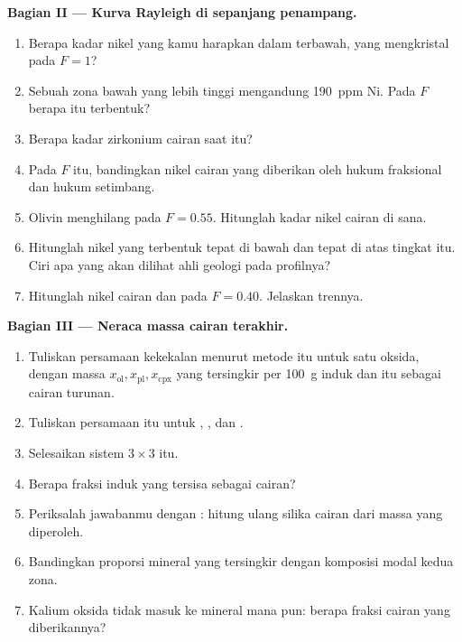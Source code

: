 \begin{problem}
\noindent\textbf{Bagian II --- Kurva Rayleigh di sepanjang penampang.}
\begin{enumerate}[resume]
\item Berapa kadar nikel yang kamu harapkan dalam  terbawah, yang mengkristal pada
$F = 1$?
\item Sebuah  zona bawah yang lebih tinggi mengandung \qty{190}{ppm} Ni. Pada $F$ berapa  itu
terbentuk?
\item Berapa kadar zirkonium cairan saat itu?
\item Pada $F$ itu, bandingkan nikel cairan yang diberikan oleh hukum fraksional dan hukum
setimbang.
\item Olivin menghilang pada $F = 0.55$. Hitunglah kadar nikel cairan
di sana.
\item Hitunglah nikel  yang terbentuk tepat di bawah dan tepat di atas tingkat
itu. Ciri apa yang akan dilihat ahli geologi pada profilnya?
\item Hitunglah nikel cairan dan  pada $F = 0.40$. Jelaskan
trennya.
\end{enumerate}

\noindent\textbf{Bagian III --- Neraca massa cairan terakhir.}
\begin{enumerate}[resume]
\item Tuliskan persamaan kekekalan menurut metode itu untuk satu oksida, dengan massa
$x_{\mathrm{ol}}, x_{\mathrm{pl}}, x_{\mathrm{cpx}}$ yang tersingkir per \qty{100}{g}
 induk dan  itu sebagai cairan turunan.
\item Tuliskan persamaan itu untuk , , dan .
\item Selesaikan sistem $3 \times 3$ itu.
\item Berapa fraksi  induk yang tersisa sebagai cairan?
\item Periksalah jawabanmu dengan : hitung ulang silika cairan dari
massa yang diperoleh.
\item Bandingkan proporsi mineral yang tersingkir dengan komposisi modal kedua
zona.
\item Kalium oksida tidak masuk ke mineral mana pun: berapa fraksi cairan yang diberikannya?
\end{enumerate}


\end{problem}
